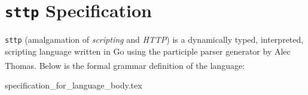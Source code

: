 \documentclass[]{full}
\theoremstyle{definition}
\begin{document}

\appendix

\cprotect\chapter{\verb|sttp| Specification}
\label{appendix:sttp-specification}

\verb|sttp| (amalgamation of \textit{scripting} and \textit{HTTP}) is a dynamically typed, interpreted, scripting language written in Go using the participle parser generator by Alec Thomas\textsuperscript{\cite{thomas_2021}}. Below is the formal grammar definition of the language:

{specification_for_language_body.tex}

\newpage
\label{endpage}

\printbibliography
\end{document}
